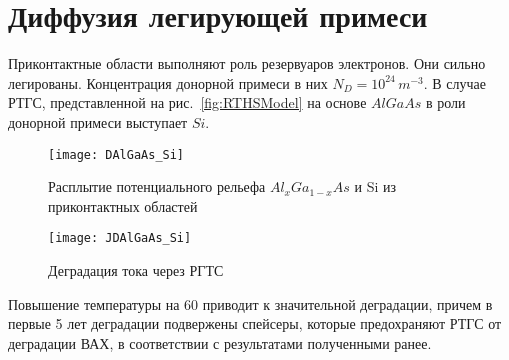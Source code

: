 \section{Диффузия легирующей примеси}

Приконтактные области выполняют роль резервуаров электронов. Они сильно легированы. Концентрация донорной примеси в них $N_{D} = 10^{24}\,m^{-3}$. В случае РТГС, представленной на рис.~\ref{fig:RTHSModel} на основе $AlGaAs$ в роли донорной примеси выступает $Si$.

\begin{figure}[h!]
	\centering
	\texttt{[image: DAlGaAs\_Si]}
	\caption{Расплытие потенциального рельефа $Al_{x}Ga_{1−x}As$ и Si из приконтактных областей} 
	\label{fig:DAlGaAs_Si}
\end{figure}

\begin{figure}[h!]
	\centering
	\texttt{[image: JDAlGaAs\_Si]}
	\caption{Деградация тока через РГТС}
	\label{fig:JDAlGaAs_Si}
\end{figure}

Повышение температуры на $60$ приводит к значительной деградации, причем в первые 5 лет деградации подвержены спейсеры, которые предохраняют РТГС от деградации ВАХ, в соответствии с результатами полученными ранее.